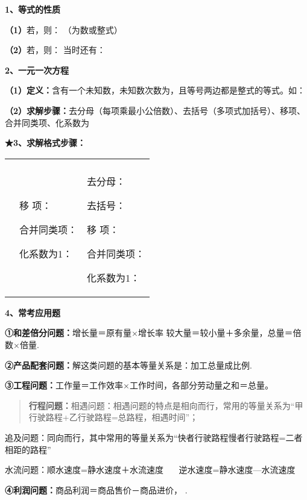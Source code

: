 \textbf{1、等式的性质}

\textbf{（1）}若，则： （为数或整式）

\textbf{（2）}若，则： 当时还有：

\textbf{2、一元一次方程}

\textbf{（1）定义：}含有一个未知数，未知数次数为，且等号两边都是整式的等式。如：

\textbf{（2）求解步骤：}去分母（每项乘最小公倍数）、去括号（多项式加括号）、移项、合并同类项、化系数为

\textbf{★3、求解格式步骤：}

\begin{longtable}[]{@{}lll@{}}
\toprule
\endhead
& &\tabularnewline
\begin{minipage}[t]{0.30\columnwidth}\raggedright
\strut
\end{minipage} & \begin{minipage}[t]{0.30\columnwidth}\raggedright
移 项：

合并同类项：

化系数为1：\strut
\end{minipage} & \begin{minipage}[t]{0.30\columnwidth}\raggedright
去分母：

去括号：

移 项：

合并同类项：

化系数为1：\strut
\end{minipage}\tabularnewline
\bottomrule
\end{longtable}

\textbf{4、常考应用题}

\textbf{①和差倍分问题：}增长量＝原有量×增长率
较大量＝较小量＋多余量，总量＝倍数×倍量.

\textbf{②产品配套问题：}解这类问题的基本等量关系是：加工总量成比例.

\textbf{③工程问题：}工作量＝工作效率×工作时间，各部分劳动量之和＝总量。

\begin{quote}
\textbf{行程问题：}相遇问题：相遇问题的特点是相向而行，常用的等量关系为``甲行驶路程+乙行驶路程=总路程，相遇时间''；
\end{quote}

追及问题：同向而行，其中常用的等量关系为``快者行驶路程慢者行驶路程=二者相距的路程''

水流问题：顺水速度=静水速度＋水流速度~~~ 逆水速度=静水速度---水流速度

\textbf{④利润问题：}商品利润＝商品售价－商品进价， .


